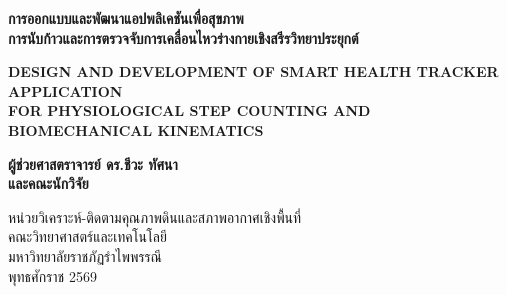 \begin{titlepage}
\begin{center}
  \vspace*{1.2cm}

  {\fontsize{20pt}{26pt}\selectfont\bfseries การออกแบบและพัฒนาแอปพลิเคชันเพื่อสุขภาพ\\การนับก้าวและการตรวจจับการเคลื่อนไหวร่างกายเชิงสรีรวิทยาประยุกต์\par}
  \vspace{0.4cm}
  {\fontsize{11pt}{15pt}\selectfont\color{rbruNavy}\bfseries DESIGN AND DEVELOPMENT OF SMART HEALTH TRACKER APPLICATION\\FOR PHYSIOLOGICAL STEP COUNTING AND BIOMECHANICAL KINEMATICS\par}

  \vspace{2.2cm}

  {\fontsize{14pt}{20pt}\selectfont\bfseries
  ผู้ช่วยศาสตราจารย์ ดร.ชีวะ ทัศนา\\
  และคณะนักวิจัย\par}

  \vfill

  {\fontsize{11pt}{16pt}\selectfont
  หน่วยวิเคราะห์-ติดตามคุณภาพดินและสภาพอากาศเชิงพื้นที่\\
  คณะวิทยาศาสตร์และเทคโนโลยี\\
  มหาวิทยาลัยราชภัฏรำไพพรรณี\\
  พุทธศักราช 2569\par}
\end{center}
\end{titlepage}
